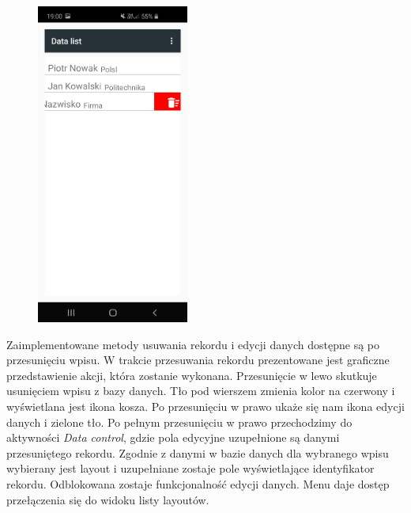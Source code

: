 \documentclass[a4paper,12pt, twoside]{article}
\begin{document}
\begin{enumerate}
\begin{figure}[H]
\begin{minipage}{.5\textwidth}
                    \label{fig:datalist}
                \end{minipage}%
    	        \begin{minipage}{.5\textwidth}
    	            \centering
    	            \includegraphics[width=5cm]{images/view_dataRemove.jpg}
                    \label{fig:datadelete}
                \end{minipage}%
    	   \end{figure}
    	   Zaimplementowane metody usuwania rekordu i edycji danych dostępne są po przesunięciu wpisu. W trakcie przesuwania rekordu prezentowane jest graficzne przedstawienie akcji, która zostanie wykonana. Przesunięcie w lewo skutkuje usunięciem wpisu z bazy danych. Tło pod wierszem zmienia kolor na czerwony i wyświetlana jest ikona kosza. 
    	   Po przesunięciu w prawo ukaże się nam ikona edycji danych i zielone tło. Po pełnym przesunięciu w prawo przechodzimy do aktywności \textit{Data control}, gdzie pola edycyjne uzupełnione są danymi przesuniętego rekordu. Zgodnie z danymi w bazie danych dla wybranego wpisu wybierany jest layout i uzupełniane zostaje pole wyświetlające identyfikator rekordu. Odblokowana zostaje funkcjonalność edycji danych. Menu daje dostęp przełączenia się do widoku listy layoutów. 

\end{enumerate}
\end{document}
